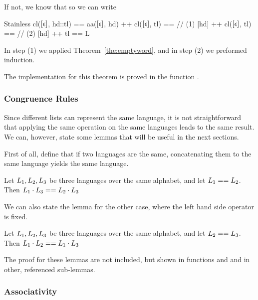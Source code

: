 If not, we know that  so we can write 

\begin{ShortCode}{Stainless}
 cl($[\epsilon]$, hd::tl) == 
 aa($[\epsilon]$, hd) ++ cl($[\epsilon]$, tl) == // (1)
 [hd] ++ cl($[\epsilon]$, tl) == // (2)
 [hd] ++ tl ==
 L
\end{ShortCode}

In step (1) we applied Theorem~\ref{the:emptyword}, and in step (2) we preformed induction.

The implementation for this theorem is proved in the function .

\subsubsection{Congruence Rules}

Since different lists can represent the same language, it is not straightforward that applying the same operation on the same languages leads to the same result. We can, however, state some lemmas that will be useful in the next sections.

First of all, define that if two languages are the same, concatenating them to the same language yields the same language.

\begin{lemma}
	\label{lem:clContentEquals}
	Let $L_{1}, L_{2}, L_{3}$ be three languages over the same alphabet, and let $L_{1} == L_{2}$. Then $L_{1} \cdot L_{3} == L_{2} \cdot L_{3}$ 
\end{lemma}

We can also state the lemma for the other case, where the left hand side operator is fixed.

\begin{lemma}
	\label{lem:clContentEquals2}
	Let $L_{1}, L_{2}, L_{3}$ be three languages over the same alphabet, and let $L_{2} == L_{3}$. Then $L_{1} \cdot L_{2} == L_{1} \cdot L_{3}$ 
\end{lemma}

The proof for these lemmas are not included, but shown in functions  and  and in other, referenced sub-lemmas.

\subsubsection{Associativity}

